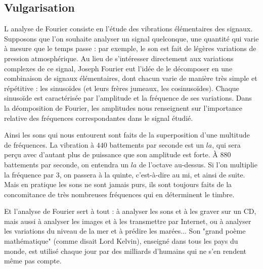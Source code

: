\documentclass[a4paper,12pt]{report}
\begin{document}
		\subsection{Vulgarisation}
		
		L analyse de Fourier consiste en l'\'etude des vibrations \'el\'ementaires des signaux. Supposons que l'on souhaite analyser un signal quelconque, une quantit\'e qui varie \`a mesure que le temps passe : par exemple, le son est fait de l\'eg\`eres variations de pression atmosph\'erique. Au lieu de s'int\'eresser directement aux variations complexes de ce signal, Joseph Fourier eut l'id\'ee de le d\'ecomposer en une combinaison de signaux \'el\'ementaires, dont chacun varie de mani\`ere tr\`es simple et r\'ep\'etitive : les sinuso\"ides (et leurs fr\`eres jumeaux, les cosinuso\"ides). Chaque sinuso\"ide est caract\'eris\'ee par l'amplitude et la fr\'equence de ses variations. Dans la d\'eomposition de Fourier, les amplitudes nous renseignent sur l'importance relative des fr\'equences correspondantes dans le signal \'etudi\'e.
		
Ainsi les sons qui nous entourent sont faits de la superposition d'une multitude de fr\'equences. La vibration \`a $440$ battements par seconde est un $la$, qui sera per\c cu avec d'autant plus de puissance que son amplitude est forte. \`A $880$ battements par seconde, on entendra un $la$ de l'octave au-dessus. Si l'on multiplie la fr\'equence par $3$, on passera \`a la quinte, c'est-\`a-dire au mi, et ainsi de suite. Mais en pratique les sons ne sont jamais purs, ils sont toujours faits de la concomitance de tr\`es nombreuses fr\'equences qui en d\'eterminent le timbre.

Et l'analyse de Fourier sert \`a tout : \`a analyser les sons et \`a les graver sur un CD, mais aussi \`a analyser les images et \`a les transmettre par Internet, ou \`a analyser les variations du niveau de la mer et \`a pr\'edire les mar\'ees...
Son "grand po\`eme math\'ematique" (comme disait Lord Kelvin), enseign\'e dans tous les pays du monde, est utilis\'e chaque jour par des milliards d'humains qui ne s'en rendent m\^eme pas compte. \\
\end{document}
